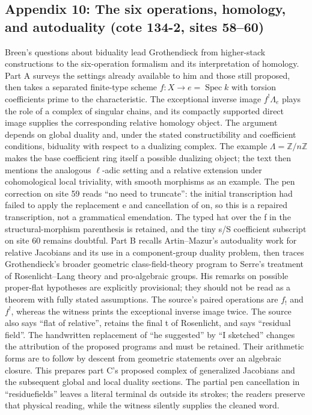 \subsection*{Appendix 10: The six operations, homology, and autoduality (cote 134-2, sites 58--60)}
Breen's questions about biduality lead Grothendieck from higher-stack constructions to the six-operation formalism and its interpretation of homology. Part A surveys the settings already available to him and those still proposed, then takes a separated finite-type scheme $f:X\to e=\operatorname{Spec}k$ with torsion coefficients prime to the characteristic. The exceptional inverse image $f^!\Lambda_e$ plays the role of a complex of singular chains, and its compactly supported direct image supplies the corresponding relative homology object. The argument depends on global duality and, under the stated constructibility and coefficient conditions, biduality with respect to a dualizing complex. The example $\Lambda=\mathbb Z/n\mathbb Z$ makes the base coefficient ring itself a possible dualizing object; the text then mentions the analogous $\ell$-adic setting and a relative extension under cohomological local triviality, with smooth morphisms as an example. The pen correction on site 59 reads ``no need to truncate'': the initial transcription had failed to apply the replacement e and cancellation of on, so this is a repaired transcription, not a grammatical emendation. The typed hat over the f in the structural-morphism parenthesis is retained, and the tiny s/S coefficient subscript on site 60 remains doubtful. Part B recalls Artin--Mazur's autoduality work for relative Jacobians and its use in a component-group duality problem, then traces Grothendieck's broader geometric class-field-theory program to Serre's treatment of Rosenlicht--Lang theory and pro-algebraic groups. His remarks on possible proper-flat hypotheses are explicitly provisional; they should not be read as a theorem with fully stated assumptions. The source's paired operations are $f_!$ and $f^!$, whereas the witness prints the exceptional inverse image twice. The source also says ``flat of relative'', retains the final t of Rosenlicht, and says ``residual field''. The handwritten replacement of ``he suggested'' by ``I sketched'' changes the attribution of the proposed programs and must be retained. Their arithmetic forms are to follow by descent from geometric statements over an algebraic closure. This prepares part C's proposed complex of generalized Jacobians and the subsequent global and local duality sections. The partial pen cancellation in ``residuefields'' leaves a literal terminal ds outside its strokes; the readers preserve that physical reading, while the witness silently supplies the cleaned word.

